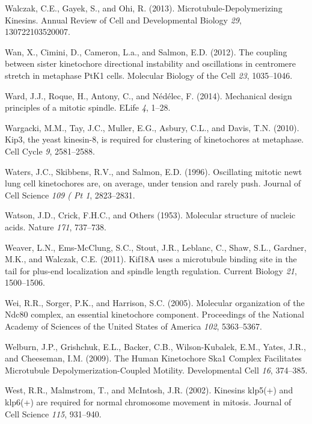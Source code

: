 \documentclass[12pt,a4paper,twoside,openright]{book}
\begin{document}
\hypertarget{ref-Walczak2013a}{}
Walczak, C.E., Gayek, S., and Ohi, R. (2013). Microtubule-Depolymerizing
Kinesins. Annual Review of Cell and Developmental Biology \emph{29},
130722103520007.

\hypertarget{ref-Wan2012}{}
Wan, X., Cimini, D., Cameron, L.a., and Salmon, E.D. (2012). The
coupling between sister kinetochore directional instability and
oscillations in centromere stretch in metaphase PtK1 cells. Molecular
Biology of the Cell \emph{23}, 1035--1046.

\hypertarget{ref-Ward2014}{}
Ward, J.J., Roque, H., Antony, C., and Nédélec, F. (2014). Mechanical
design principles of a mitotic spindle. ELife \emph{4}, 1--28.

\hypertarget{ref-Wargacki2010}{}
Wargacki, M.M., Tay, J.C., Muller, E.G., Asbury, C.L., and Davis, T.N.
(2010). Kip3, the yeast kinesin-8, is required for clustering of
kinetochores at metaphase. Cell Cycle \emph{9}, 2581--2588.

\hypertarget{ref-Waters1996a}{}
Waters, J.C., Skibbens, R.V., and Salmon, E.D. (1996). Oscillating
mitotic newt lung cell kinetochores are, on average, under tension and
rarely push. Journal of Cell Science \emph{109 ( Pt 1}, 2823--2831.

\hypertarget{ref-watson1953molecular}{}
Watson, J.D., Crick, F.H.C., and Others (1953). Molecular structure of
nucleic acids. Nature \emph{171}, 737--738.

\hypertarget{ref-Weaver2011}{}
Weaver, L.N., Ems-McClung, S.C., Stout, J.R., Leblanc, C., Shaw, S.L.,
Gardner, M.K., and Walczak, C.E. (2011). Kif18A uses a microtubule
binding site in the tail for plus-end localization and spindle length
regulation. Current Biology \emph{21}, 1500--1506.

\hypertarget{ref-Wei2005}{}
Wei, R.R., Sorger, P.K., and Harrison, S.C. (2005). Molecular
organization of the Ndc80 complex, an essential kinetochore component.
Proceedings of the National Academy of Sciences of the United States of
America \emph{102}, 5363--5367.

\hypertarget{ref-Welburn2009}{}
Welburn, J.P., Grishchuk, E.L., Backer, C.B., Wilson-Kubalek, E.M.,
Yates, J.R., and Cheeseman, I.M. (2009). The Human Kinetochore Ska1
Complex Facilitates Microtubule Depolymerization-Coupled Motility.
Developmental Cell \emph{16}, 374--385.

\hypertarget{ref-West2002}{}
West, R.R., Malmstrom, T., and McIntosh, J.R. (2002). Kinesins klp5(+)
and klp6(+) are required for normal chromosome movement in mitosis.
Journal of Cell Science \emph{115}, 931--940.
\end{document}
